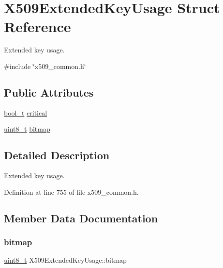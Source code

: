 \hypertarget{structX509ExtendedKeyUsage}{}\section{X509\+Extended\+Key\+Usage Struct Reference}
\label{structX509ExtendedKeyUsage}


Extended key usage.  




{\ttfamily \#include \char`\"{}x509\+\_\+common.\+h\char`\"{}}

\subsection*{Public Attributes}
\begin{DoxyCompactItemize}
\item 
\hyperlink{compiler__port_8h_a812d16e5494522586b3784e55d479912}{bool\+\_\+t} \hyperlink{structX509ExtendedKeyUsage_a482c22b220014930529c692a4138e958}{critical}
\item 
\hyperlink{stdint_8h_aba7bc1797add20fe3efdf37ced1182c5}{uint8\+\_\+t} \hyperlink{structX509ExtendedKeyUsage_ad8972a4feaf8d58626f66650ff9e3ebb}{bitmap}
\end{DoxyCompactItemize}


\subsection{Detailed Description}
Extended key usage. 

Definition at line 755 of file x509\+\_\+common.\+h.



\subsection{Member Data Documentation}
\mbox{\label{structX509ExtendedKeyUsage_ad8972a4feaf8d58626f66650ff9e3ebb}} 
\subsubsection{\texorpdfstring{bitmap}{bitmap}}
{\footnotesize\ttfamily \hyperlink{stdint_8h_aba7bc1797add20fe3efdf37ced1182c5}{uint8\+\_\+t} X509\+Extended\+Key\+Usage\+::bitmap}



